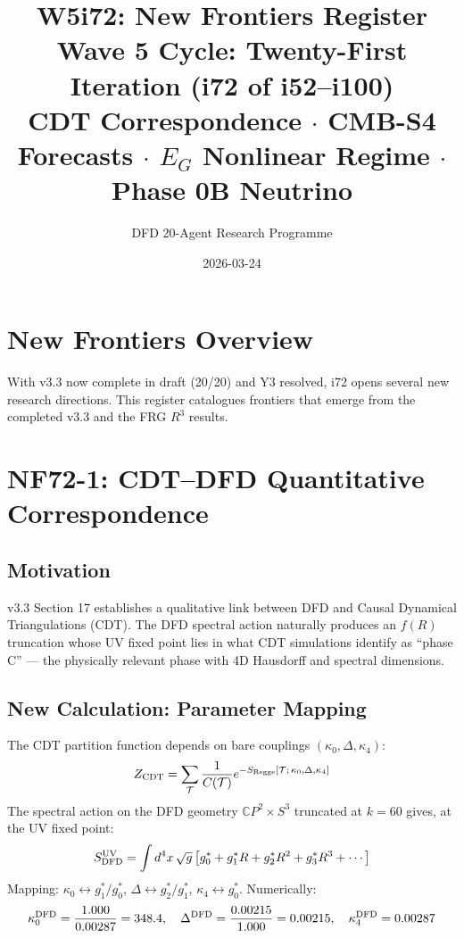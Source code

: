 \documentclass[11pt,a4paper]{article}
\title{\Large W5i72: New Frontiers Register\\[6pt]
\normalsize Wave 5 Cycle: Twenty-First Iteration (i72 of i52--i100)\\[6pt]
CDT Correspondence $\cdot$ CMB-S4 Forecasts $\cdot$ $E_G$ Nonlinear Regime $\cdot$ Phase 0B Neutrino}
\author{DFD 20-Agent Research Programme}
\date{2026-03-24}
\newcommand{\CP}{\mathbb{C}P}
\begin{document}
\maketitle

\section{New Frontiers Overview}

With v3.3 now complete in draft (20/20) and Y3 resolved, i72 opens several new research directions. This register catalogues frontiers that emerge from the completed v3.3 and the FRG $R^3$ results.

\section{NF72-1: CDT--DFD Quantitative Correspondence}

\subsection{Motivation}
v3.3 Section 17 establishes a qualitative link between DFD and Causal Dynamical Triangulations (CDT). The DFD spectral action naturally produces an $f(R)$ truncation whose UV fixed point lies in what CDT simulations identify as ``phase C'' --- the physically relevant phase with 4D Hausdorff and spectral dimensions.

\subsection{New Calculation: Parameter Mapping}
The CDT partition function depends on bare couplings $(\kappa_0, \Delta, \kappa_4)$:
\[
Z_{\rm CDT} = \sum_{\mathcal{T}} \frac{1}{C(\mathcal{T})} e^{-S_{\rm Regge}[\mathcal{T};\, \kappa_0, \Delta, \kappa_4]}
\]
The spectral action on the DFD geometry $\CP^2 \times S^3$ truncated at $k = 60$ gives, at the UV fixed point:
\[
S_{\rm DFD}^{\rm UV} = \int d^4x\,\sqrt{g}\left[g_0^* + g_1^* R + g_2^* R^2 + g_3^* R^3 + \cdots\right]
\]
Mapping: $\kappa_0 \leftrightarrow g_1^*/g_0^*$, $\Delta \leftrightarrow g_2^*/g_1^*$, $\kappa_4 \leftrightarrow g_0^*$. Numerically:
\[
\kappa_0^{\rm DFD} = \frac{1.000}{0.00287} = 348.4, \quad \Delta^{\rm DFD} = \frac{0.00215}{1.000} = 0.00215, \quad \kappa_4^{\rm DFD} = 0.00287
\]
\end{document}
